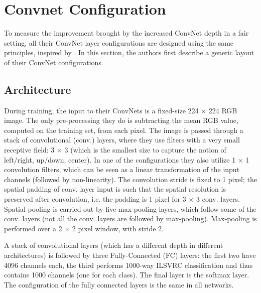 \documentclass[10pt,twocolumn,letterpaper]{article}
\begin{document}
\section{Convnet Configuration}
To measure the improvement brought by the increased ConvNet depth in a fair setting, all their
ConvNet layer configurations are designed using the same principles, inspired by \cite{ciresan2011flexible,krizhevsky2012imagenet}. 
In this section, the authors first describe a generic layout of their ConvNet
configurations.
\subsection{Architecture}
During training, the input to their ConvNets is a fixed-size 224 $\times$ 224 RGB image. The only pre-processing they do is subtracting the mean RGB value, computed on the training set, from each pixel.
The image is passed through a stack of convolutional (conv.) layers, where they use filters with a very
small receptive field: 3 $\times$ 3 (which is the smallest size to capture the notion of left/right, up/down,
center). In one of the configurations they also utilize 1 $\times$ 1 convolution filters, which can be seen as
a linear transformation of the input channels (followed by non-linearity). The convolution stride is
fixed to 1 pixel; the spatial padding of conv. layer input is such that the spatial resolution is preserved
after convolution, i.e. the padding is 1 pixel for 3 $\times$ 3 conv. layers. Spatial pooling is carried out by
five max-pooling layers, which follow some of the conv. layers (not all the conv. layers are followed
by max-pooling). Max-pooling is performed over a 2 $\times$ 2 pixel window, with stride 2.
\par
A stack of convolutional layers (which has a different depth in different architectures) is followed by
three Fully-Connected (FC) layers: the first two have 4096 channels each, the third performs 1000-way ILSVRC classification and thus contains 1000 channels (one for each class). The final layer is
the softmax layer. The configuration of the fully connected layers is the same in all networks.


\end{document}
